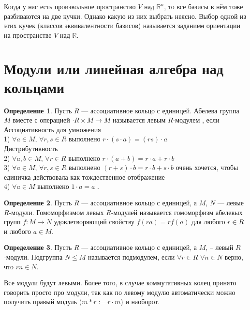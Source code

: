 \documentclass[10pt,a4paper,oneside]{book}
\theoremstyle{definition}
\newtheorem{defn}{Определение}
\newcommand{\mb}[1]{\mathbb{#1}}
\begin{document}
Когда у нас есть произвольное пространство $V$ над $\mb R^n$, то все базисы в нём тоже разбиваются на две кучки. Однако какую из них выбрать неясно. Выбор одной из этих кучек (классов эквивалентности базисов) называется заданием ориентации на пространстве $V$ над $\mb R$.


\section{Модули или линейная алгебра над кольцами}

\begin{defn}
Пусть $R$ --- ассоциативное кольцо с единицей. Абелева группа $M$ вместе с операцией $\cdot R\times M \to M$ называется  левым $R$-модулем , если 
Ассоциативность для умножения\\
1) $\forall a \in M,\, \forall r,s\in R$ выполнено $r\cdot(s\cdot a)=(rs)\cdot a$\\
Дистрибутивность \\
2) $\forall a,b \in M,\, \forall r\in R$ выполнено $r\cdot(a+b)=r\cdot a+ r\cdot b$\\
3) $\forall a \in M,\, \forall r,s\in R$ выполнено $(r+s)\cdot b=r\cdot b + s\cdot b$
очень хочется, чтобы единичка действовала как тождественное отображение\\
4) $\forall a \in M$ выполнено $1\cdot a=a$ .\\
\end{defn}

\begin{defn}
Пусть $R$ --- ассоциативное кольцо с единицей, а $M$, $N$ --- левые $R$-модули.  Гомоморфизмом левых $R$-модулей называется гомоморфизм абелевых групп $f\colon M \to N$ удовлетворяющий свойству $f(ra)=rf(a)$ для любого $r\in R$ и любого $a\in M$.
\end{defn}

\begin{defn}
Пусть $R$ --- ассоциативное кольцо с единицей, а $M$, -- левый $R$-модули. Подгруппа $N\leq M$ называется подмодулем, если $\forall r\in R$ $\forall n\in N$ верно, что $rn \in N$.
\end{defn}

Все модули будут левыми. Более того, в случае коммутативных колец принято говорить просто про модули, так как по левому модулю автоматически можно  получить правый модуль ($m*r:=r\cdot m$) и наоборот.
\end{document}
